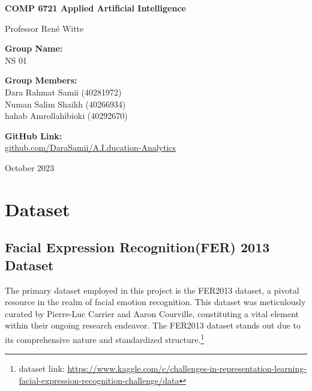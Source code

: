 \documentclass[]{report}
\begin{document}
\begin{titlepage}
	\begin{center}
		\vspace*{1cm}

		
		
		\vspace*{2cm}
		
		\textbf{\Large COMP 6721 Applied Artificial Intelligence}
		
		\vspace{0.5cm}
		Professor René Witte
		
		\vspace{1.5cm}
		\textbf{Group Name:}\\
		NS 01
		\vspace{1.5cm}
		
		\textbf{Group Members:}\\
		Dara Rahmat Samii (40281972)\\ Numan Salim Shaikh (40266934) \\ hahab Amrollahibioki (40292670)
		
		
		\vfill
		
		\textbf{GitHub Link:}\\
		\href{https://github.com/DaraSamii/A.I.ducation-Analytics}{github.com/DaraSamii/A.I.ducation-Analytics}
		
		\vfill

		
		October 2023
		
	\end{center}
\end{titlepage}
\newpage
\chapter{Dataset}
\section{Facial Expression Recognition(FER) 2013 Dataset}
The primary dataset employed in this project is the FER2013 dataset\cite{FER2013}, a pivotal resource in the realm of facial emotion recognition. This dataset was meticulously curated by Pierre-Luc Carrier and Aaron Courville, constituting a vital element within their ongoing research endeavor. The FER2013 dataset stands out due to its comprehensive nature and standardized structure.\footnote{dataset link: \href{https://www.kaggle.com/c/challenges-in-representation-learning-facial-expression-recognition-challenge/data}{https://www.kaggle.com/c/challenges-in-representation-learning-facial-expression-recognition-challenge/data}}
\end{document}
